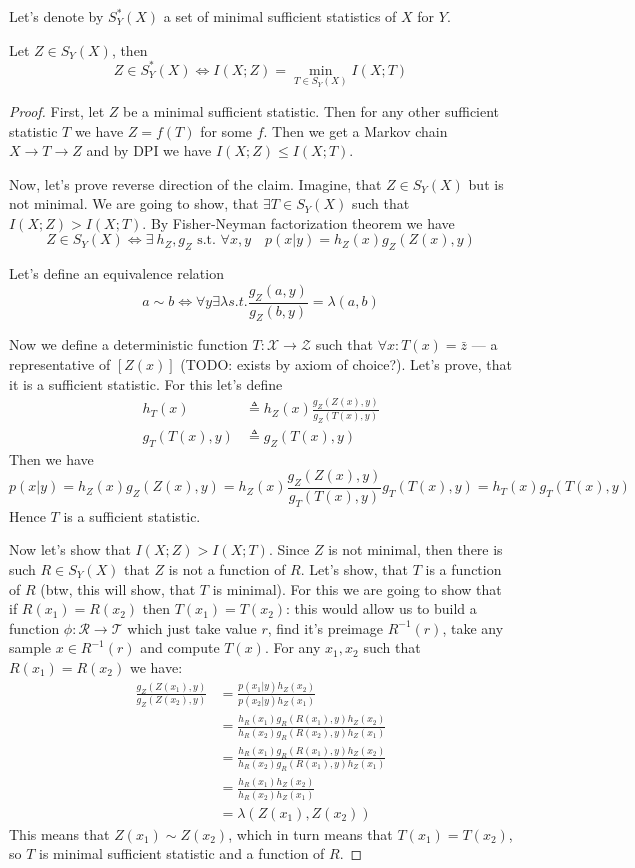 \documentclass{article}
\begin{document}
Let's denote by $S_Y^*(X)$ a set of minimal sufficient statistics of $X$ for $Y$.
\begin{lemma}
Let $Z \in S_Y(X)$, then
\[
Z \in S_Y^*(X) \Longleftrightarrow I(X;Z) = \min_{T \in S_Y(X)} I(X;T)
\]
\end{lemma}

\begin{proof}
First, let $Z$ be a minimal sufficient statistic.
Then for any other sufficient statistic $T$ we have $Z = f(T)$ for some $f$.
Then we get a Markov chain $X \to T \to Z$ and by DPI we have $I(X;Z) \leq I(X;T)$.

Now, let's prove reverse direction of the claim.
Imagine, that $Z \in S_Y(X)$ but is not minimal.
We are going to show, that $\exists T \in S_Y(X)$ such that $I(X;Z) > I(X;T)$.
By Fisher-Neyman factorization theorem we have
\[
Z \in S_Y(X) \Longleftrightarrow \exists\ h_Z, g_Z \text{ s.t. } \forall x,y \quad p(x|y) = h_Z(x) g_Z(Z(x), y)
\]

Let's define an equivalence relation
\[
a \sim b \Longleftrightarrow \forall y \exists \lambda s.t. \frac{g_Z(a, y)}{g_Z(b, y)} = \lambda(a, b)
\]

Now we define a deterministic function $T:\mathcal{X} \to \mathcal{Z}$ such that $\forall x: T(x) = \bar{z}$ --- a representative of $[Z(x)]$ (TODO: exists by axiom of choice?).
Let's prove, that it is a sufficient statistic.
For this let's define
\[
\begin{split}
h_T(x) &\triangleq h_Z(x) \frac{g_Z(Z(x), y)}{g_Z(T(x), y)} \\
g_T(T(x), y) &\triangleq g_Z(T(x), y)
\end{split}
\]
Then we have
\[
p(x|y) = h_Z(x) g_Z(Z(x), y) = h_Z(x) \frac{g_Z(Z(x), y)}{g_T(T(x), y)} g_T(T(x), y) = h_T(x) g_T(T(x), y)
\]
Hence $T$ is a sufficient statistic.

Now let's show that $I(X;Z) > I(X;T)$.
Since $Z$ is not minimal, then there is such $R \in S_Y(X)$ that $Z$ is not a function of $R$.
Let's show, that $T$ is a function of $R$ (btw, this will show, that $T$ is minimal).
For this we are going to show that if $R(x_1) = R(x_2)$ then $T(x_1) = T(x_2)$: this would allow us to build a function $\phi:\mathcal{R} \to \mathcal{T}$ which just take value $r$, find it's preimage $R^{-1}(r)$, take any sample $x \in R^{-1}(r)$ and compute $T(x)$.
For any $x_1, x_2$ such that $R(x_1) = R(x_2)$ we have:
\[
\begin{split}
\frac{g_Z(Z(x_1), y)}{g_Z(Z(x_2), y)}
&= \frac{p(x_1 | y) h_Z(x_2)}{p(x_2 | y) h_Z(x_1)} \\
&= \frac{h_R(x_1) g_R(R(x_1), y) h_Z(x_2)}{h_R(x_2) g_R(R(x_2), y) h_Z(x_1)} \\
&= \frac{h_R(x_1) g_R(R(x_1), y) h_Z(x_2)}{h_R(x_2) g_R(R(x_1), y) h_Z(x_1)} \\
&= \frac{h_R(x_1) h_Z(x_2)}{h_R(x_2) h_Z(x_1)} \\
&= \lambda(Z(x_1), Z(x_2))
\end{split}
\]
This means that $Z(x_1) \sim Z(x_2)$, which in turn means that $T(x_1) = T(x_2)$, so $T$ is minimal sufficient statistic and a function of $R$.
\end{proof}
\end{document}
